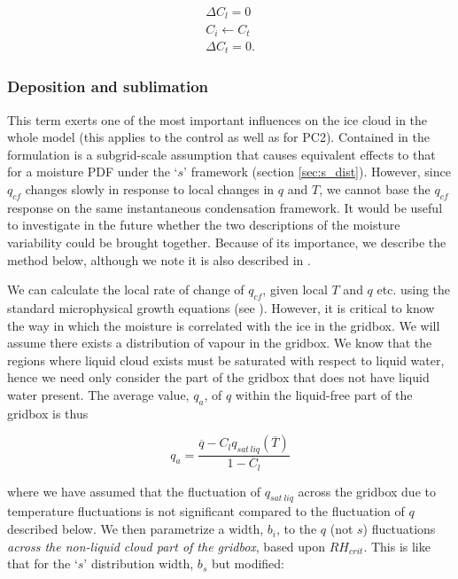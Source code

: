 \documentclass{UMDP_article}
\begin{document}
\begin{eqnarray}
\Delta C_l = 0  \nonumber \\
C_i \leftarrow C_t \nonumber \\
\Delta C_t = 0.
\label{eq:lsp_het}
\end{eqnarray}

\subsubsection{Deposition and sublimation}
\label{sec:mp_depsub}
This term exerts one of the most important influences on the ice cloud in
the whole model (this applies to the control as well as for PC2). Contained
in the formulation is a subgrid-scale assumption that causes equivalent 
effects to that for a moisture PDF under the `$s$' framework
(section \ref{sec:s_dist}). However, since ${q_{cf}}$ changes
slowly in response to local changes in $q$ and $T$, we cannot base the
$q_{cf}$ response on the same instantaneous condensation framework. It would
be useful to investigate in the future whether the two descriptions of the
moisture variability could be brought together. 
Because of its importance,
we describe the method below, although we note it is also described in
.

We can calculate the local rate of change of $q_{cf}$, given local $T$ and $q$
etc. using the standard microphysical growth equations (see ). 
However, it is critical to know the way in which
the moisture is correlated with the ice in the gridbox. We will assume
there exists a distribution of vapour in the gridbox. We know that
the regions where liquid cloud exists must be saturated with respect
to liquid water, hence we need only consider the part of the gridbox
that does not have liquid water present. The average value, $q_a$,
of $q$ within the liquid-free part of the gridbox is thus

\begin{equation}
q_a = \frac{  \overline{q} - C_l q_{sat \, liq}(\overline{T}) } {1 - C_l}
\label{eq:qa}
\end{equation}

where we have assumed that the fluctuation of $q_{sat~liq}$ across
the gridbox due to temperature fluctuations is not significant compared
to the fluctuation of $q$ described below. We then parametrize a width, $b_i$,
to the $q$ (not $s$) fluctuations \textit{across the non-liquid cloud part
of the gridbox}, based upon $RH_{crit}$. This is like that for the `$s$'
distribution width, $b_s$ but modified:
\end{document}
